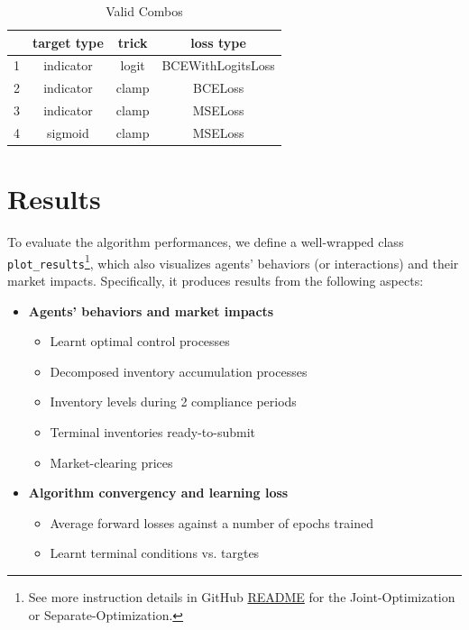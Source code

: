 \documentclass[a4paper,10pt]{article}
\newcommand{\1}{\mathbf{1}}
\begin{document}
\begin{table}[h]
    \centering
    \begin{tabular}{*{4}{c}}
        \toprule
        \, & \textbf{target type} & \textbf{trick} & \textbf{loss type} \\
        \midrule
        1 & indicator & logit & BCEWithLogitsLoss \\
        2 & indicator & clamp & BCELoss \\
        3 & indicator & clamp & MSELoss \\
        4 & sigmoid   & clamp & MSELoss \\
        \toprule
    \end{tabular}
    \caption{Valid Combos}
    \label{tab:valid-combos}
\end{table}

\vspace{-5pt}

\section{Results}\label{results}

To evaluate the algorithm performances, we define a
well-wrapped class \texttt{plot\_results}\footnote{See more instruction details in GitHub \href{https://github.com/OrangeAoo/PA-MFG-FBSDE/blob/3cffc5e8dbe09fbc880f6c2c70d76e0b6a1b8c3c/2Period/Joint_Optim_2Prdx1/README.md}{README} for the Joint-Optimization or Separate-Optimization.}, which also visualizes agents' behaviors (or interactions) and their market impacts. Specifically, it produces results from the following aspects:

\vspace{-0.5\topsep}

\begin{itemize}
  \setlength{\parskip}{0pt}
  \item\textbf{Agents' behaviors and market impacts}
    \begin{itemize}
      \tightlist
      \item Learnt optimal control processes
      \item Decomposed inventory accumulation processes
      \item Inventory levels during 2 compliance periods
      \item Terminal inventories ready-to-submit
      \item Market-clearing prices
    \end{itemize}
  \item\textbf{Algorithm convergency and learning loss}
      \begin{itemize}
        \tightlist
        \item Average forward losses against a number of epochs trained
        \item Learnt terminal conditions vs. targtes
      \end{itemize}
\end{itemize}
\end{document}
